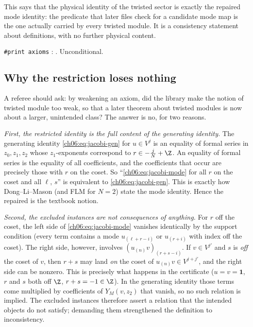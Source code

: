 \begin{physics}
This says that the physical identity of the twisted sector is exactly the repaired mode identity: the predicate that later files check for a candidate mode map is the one actually carried by every twisted module. It is a consistency statement about definitions, with no further physical content.
\end{physics}
\begin{status}
\texttt{\#print axioms} : .  Unconditional.
\end{status}

\subsection{Why the restriction loses nothing}\label{ch06:sec:nothinglost}

A referee should ask: by weakening an axiom, did the library make the notion of twisted module too
weak, so that a later theorem about twisted modules is now about a larger, unintended class?
The answer is no, for two reasons.

\emph{First, the restricted identity is the full content of the generating identity.}  The
generating identity \eqref{ch06:eq:jacobi-gen} for $u\in V^j$ is an equality of formal series in
$z_0,z_1,z_2$ whose $z_1$-exponents correspond to $r\in-\frac jN+\Z$.  An equality of formal series
is the equality of all coefficients, and the coefficients that occur are precisely those with $r$
on the coset.  So ``\eqref{ch06:eq:jacobi-mode} for all $r$ on the coset and all $\ell$, $s$'' is
equivalent to \eqref{ch06:eq:jacobi-gen}.  This is exactly how Dong--Li--Mason (and FLM for $N=2$)
state the mode identity.  Hence the repaired  is the textbook notion.

\emph{Second, the excluded instances are not consequences of anything.}  For $r$ off the coset,
the left side of \eqref{ch06:eq:jacobi-mode} vanishes identically by the support condition (every
term contains a mode $u_{(\ell+r-i)}$ or $u_{(r+i)}$ with index off the coset).  The right side,
however, involves $(u_{(n)}v)_{(r+s-i)}$.  If $v\in V^{j'}$ and $s$ is \emph{off} the coset of $v$,
then $r+s$ may land \emph{on} the coset of $u_{(n)}v\in V^{j+j'}$, and the right side can be
nonzero.  This is precisely what happens in the certificate ($u=v=\mathbf 1$, $r$ and $s$ both off
$\Z$, $r+s=-1\in\Z$).  In the generating identity those terms come multiplied by coefficients of
$Y_M(v,z_2)$ that vanish, so no such relation is implied.  The excluded instances therefore assert
a relation that the intended objects do not satisfy; demanding them strengthened the definition to
inconsistency.

